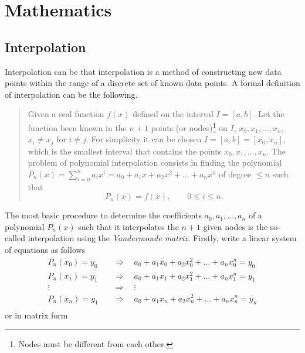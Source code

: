 \chapter{Mathematics}
\label{chapter1}
%
\section{Interpolation}
Interpolation can be that interpolation is a method of constructing new data points within the range of a discrete set of known data points. A formal definition of interpolation can be the following.
\begin{quotation}\noindent
	Given a real function $f(x)$ defined on the interval $I=\left[a,b\right]$. Let the function been known in the $n+1$ points (or nodes)\footnote{Nodes must be different from each other.} on $I$, $x_0,x_1,\dots,x_n$, $x_i\neq x_j$ for $i \neq j$. For simplicity it can be chosen $I=\left[a,b\right]=\left[x_0,x_n\right]$, which is the smallest interval that contains the points $x_0,x_1,\dots,x_n$.
	The problem of polynomial interpolation consists in finding the polynomial $P_n(x) = \sum_{i=0}^{n} a_i x^i = a_0 + a_1x + a_2x^2 + \dots + a_n x^n$ of degree $\le n$ such that
	\[
	P_n(x) = f(x), \qquad 0 \le i \le n.
	\]
\end{quotation}
The most basic procedure to determine the coefficients $a_0, a_1, \dots , a_n$ of a polynomial $P_n(x)$ such that it interpolates the $n+1$ given nodes is the so-called interpolation using the \textit{Vandermonde matrix}.
Firstly, write a linear system of equations as follows
\begin{equation*}
\begin{aligned}
P_n(x_0) = y _0 \quad&\Rightarrow\quad a_0 + a_1x_0 + a_2x_0^2 + \dots + a_nx_0^n = y_0 \\
P_n(x_1) = y _1 \quad&\Rightarrow\quad a_0 + a_1x_1 + a_2x_1^2 + \dots + a_nx_1^n = y_1 \\
\vdots \quad&\Rightarrow\quad \vdots\\
P_n(x_n) = y _1 \quad&\Rightarrow\quad a_0 + a_1x_n + a_2x_n^2 + \dots + a_nx_n^n = y_n \\
\end{aligned}
\end{equation*}
or in matrix form
